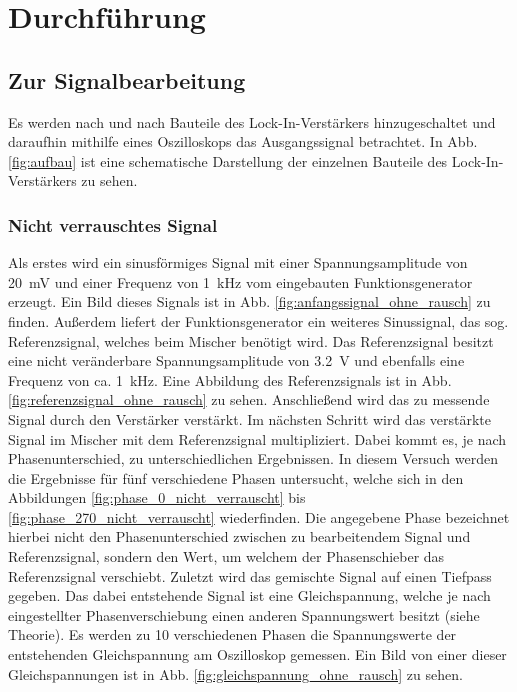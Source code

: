 
\section{Durchführung}
\subsection{Zur Signalbearbeitung}
Es werden nach und nach Bauteile des Lock-In-Verstärkers hinzugeschaltet und daraufhin mithilfe eines Oszilloskops das Ausgangssignal betrachtet. In Abb. \ref{fig:aufbau} ist eine schematische Darstellung der einzelnen Bauteile des Lock-In-Verstärkers zu sehen.
\subsubsection{Nicht verrauschtes Signal}
Als erstes wird ein sinusförmiges Signal mit einer Spannungsamplitude von \SI{20}{\milli\volt} und einer Frequenz von \SI{1}{\kilo\hertz} vom eingebauten Funktionsgenerator erzeugt. Ein Bild dieses Signals ist in Abb. \ref{fig:anfangssignal_ohne_rausch} zu finden. Außerdem liefert der Funktionsgenerator ein weiteres Sinussignal, das sog. Referenzsignal, welches beim Mischer benötigt wird. Das Referenzsignal besitzt eine nicht veränderbare Spannungsamplitude von \SI{3.2}{\volt} und ebenfalls eine Frequenz von ca. \SI{1}{\kilo\hertz}. Eine Abbildung des Referenzsignals ist in Abb. \ref{fig:referenzsignal_ohne_rausch} zu sehen.
Anschließend wird das zu messende Signal durch den Verstärker verstärkt.
Im nächsten Schritt wird das verstärkte Signal im Mischer mit dem Referenzsignal multipliziert. Dabei kommt es, je nach Phasenunterschied, zu unterschiedlichen Ergebnissen. In diesem Versuch werden die Ergebnisse für fünf verschiedene Phasen untersucht, welche sich in den Abbildungen \ref{fig:phase_0_nicht_verrauscht} bis \ref{fig:phase_270_nicht_verrauscht} wiederfinden. Die angegebene Phase bezeichnet hierbei nicht den Phasenunterschied zwischen zu bearbeitendem Signal und Referenzsignal, sondern den Wert, um welchem der Phasenschieber das Referenzsignal verschiebt.
Zuletzt wird das gemischte Signal auf einen Tiefpass gegeben. Das dabei entstehende Signal ist eine Gleichspannung, welche je nach eingestellter Phasenverschiebung einen anderen Spannungswert besitzt (siehe Theorie). Es werden zu 10 verschiedenen Phasen die Spannungswerte der entstehenden Gleichspannung am Oszilloskop gemessen. Ein Bild von einer dieser Gleichspannungen ist in Abb. \ref{fig:gleichspannung_ohne_rausch} zu sehen.

